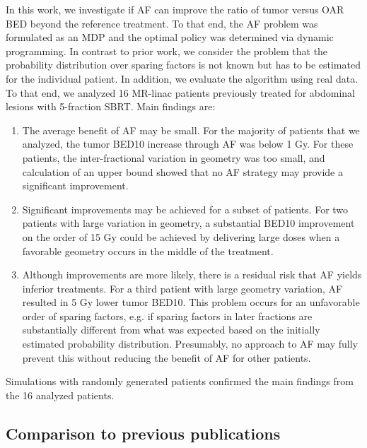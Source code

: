 \documentclass[11pt]{article}
\begin{document}
In this work, we investigate if AF can improve the ratio of tumor versus OAR BED beyond the reference treatment. To that end, the AF problem was formulated as an MDP and the optimal policy was determined via dynamic programming. In contrast to prior work, we consider the problem that the probability distribution over sparing factors is not known but has to be estimated for the individual patient. In addition, we evaluate the algorithm using real data. To that end, we analyzed 16 MR-linac patients previously treated for abdominal lesions with 5-fraction SBRT. Main findings are:

\begin{enumerate}
\item The average benefit of AF may be small. For the majority of patients that we analyzed, the tumor BED10 increase through AF was below 1 Gy. For these patients, the inter-fractional variation in geometry was too small, and calculation of an upper bound showed that no AF strategy may provide a significant improvement.
\item Significant improvements may be achieved for a subset of patients. For two patients with large variation in geometry, a substantial BED10 improvement on the order of 15 Gy could be achieved by delivering large doses when a favorable geometry occurs in the middle of the treatment.
\item Although improvements are more likely, there is a residual risk that AF yields inferior treatments. For a third patient with large geometry variation, AF resulted in 5 Gy lower tumor BED10. This problem occurs for an unfavorable order of sparing factors, e.g. if sparing factors in later fractions are substantially different from what was expected based on the initially estimated probability distribution. Presumably, no approach to AF may fully prevent this without reducing the benefit of AF for other patients.
\end{enumerate}

Simulations with randomly generated patients confirmed the main findings from the 16 analyzed patients.

\subsection{Comparison to previous publications}
\end{document}
